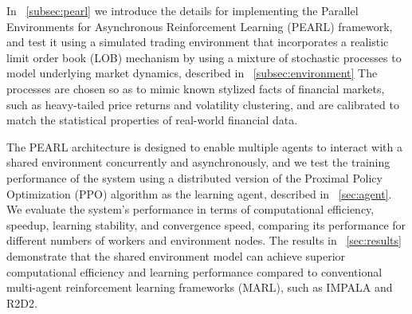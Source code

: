 In ~\autoref{subsec:pearl} we introduce the details for implementing the Parallel Environments for Asynchronous Reinforcement Learning (PEARL) framework,
and test it using a simulated trading environment that incorporates a realistic limit order book (LOB) mechanism
by using a mixture of stochastic processes to model underlying market dynamics, described in ~\autoref{subsec:environment}
The processes are chosen so as to mimic known stylized facts of financial markets, such as heavy-tailed price returns and
volatility clustering, and are calibrated to match the statistical properties of real-world financial data.

The PEARL architecture is designed to enable multiple agents to interact with a shared environment concurrently and asynchronously,
and we test the training performance of the system using a distributed version of the Proximal Policy Optimization (PPO) algorithm
as the learning agent, described in ~\autoref{sec:agent}.
We evaluate the system's performance in terms of computational efficiency, speedup, learning stability, and convergence speed,
comparing its performance for different numbers of workers and environment nodes.
The results in ~\autoref{sec:results} demonstrate that the shared environment model can achieve superior computational efficiency and learning performance compared to
conventional multi-agent reinforcement learning frameworks (MARL), such as IMPALA and R2D2.

